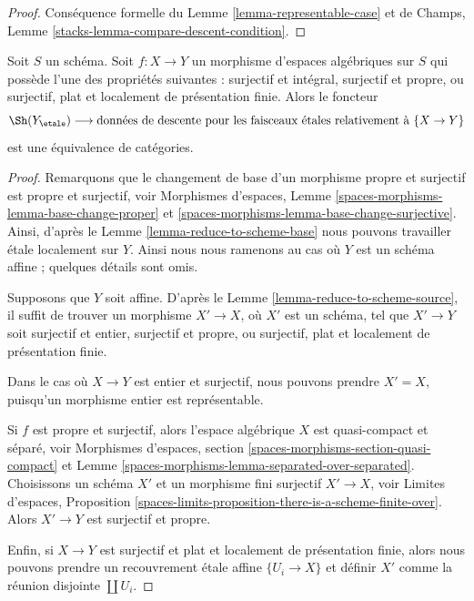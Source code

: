 \begin{proof}
Conséquence formelle du Lemme \ref{lemma-representable-case}
et de Champs, Lemme \ref{stacks-lemma-compare-descent-condition}.
\end{proof}

\begin{lemma}
\label{lemma-glue-etale-sheaf-proper-surjective}
Soit $S$ un schéma. Soit $f : X \to Y$ un morphisme d'espaces algébriques sur $S$ qui possède l'une des propriétés suivantes : surjectif et intégral, surjectif et propre, ou surjectif, plat et localement de présentation finie. Alors le foncteur $$
\Sh(Y_\etale)
\longrightarrow
\text{données de descente pour les faisceaux \'etales relativement à }\{X \to Y\}
$$ est une équivalence de catégories.
\end{lemma}

\begin{proof}
Remarquons que le changement de base d'un morphisme propre et surjectif est
propre et surjectif, voir
Morphismes d'espaces, Lemme \ref{spaces-morphisms-lemma-base-change-proper}
et \ref{spaces-morphisms-lemma-base-change-surjective}.
Ainsi, d'après le Lemme \ref{lemma-reduce-to-scheme-base}
nous pouvons travailler \'etale localement sur $Y$. Ainsi
nous nous ramenons au cas où $Y$ est un schéma affine ; quelques détails sont omis.

\medskip\noindent
Supposons que $Y$ soit affine. D'après le Lemme \ref{lemma-reduce-to-scheme-source},
il suffit de trouver un morphisme $X' \to X$, où $X'$ est un schéma, tel que $X' \to Y$ soit surjectif et entier, surjectif et propre, ou surjectif, plat et localement de présentation finie.

\medskip\noindent
Dans le cas où $X \to Y$ est entier et surjectif, nous pouvons prendre $X' = X$,
puisqu'un morphisme entier est représentable.

\medskip\noindent
Si $f$ est propre et surjectif, alors l'espace algébrique
$X$ est quasi-compact et séparé, voir
Morphismes d'espaces, section \ref{spaces-morphisms-section-quasi-compact} et
Lemme \ref{spaces-morphisms-lemma-separated-over-separated}.
Choisissons un schéma $X'$ et un morphisme fini surjectif $X' \to X$, voir
Limites d'espaces, Proposition
\ref{spaces-limits-proposition-there-is-a-scheme-finite-over}.
Alors $X' \to Y$ est surjectif et propre.

\medskip\noindent
Enfin, si $X \to Y$ est surjectif et plat et localement de présentation finie, alors nous pouvons prendre un recouvrement \'etale affine $\{U_i \to X\}$ et définir $X'$ comme la réunion disjointe $\coprod U_i$.
\end{proof}

